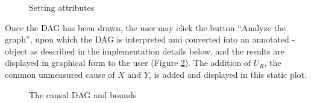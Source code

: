 \begin{figure}
\caption{Setting attributes}\label{fig:Cardinality}
\end{figure}

Once the DAG has been drawn, the user may click the button ``Analyze the graph'', upon which the DAG is interpreted and converted into an annotated -object \citep{igraph} as described in the implementation details below, and the results are displayed in graphical form to the user (Figure \ref{fig:causalDAG}). The addition of \(U_R\), the common unmeasured cause of \(X\) and \(Y\), is added and displayed in this static plot.

\begin{figure}
\caption{The causal DAG and bounds}\label{fig:causalDAG}
\end{figure}

